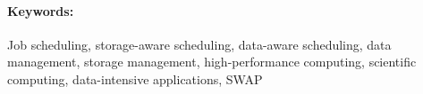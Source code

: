 \paragraph{Keywords:}
\label{sec:keywords}

Job scheduling, storage-aware scheduling, data-aware scheduling, 
data management, storage management, high-performance computing, 
scientific computing, data-intensive applications, SWAP

